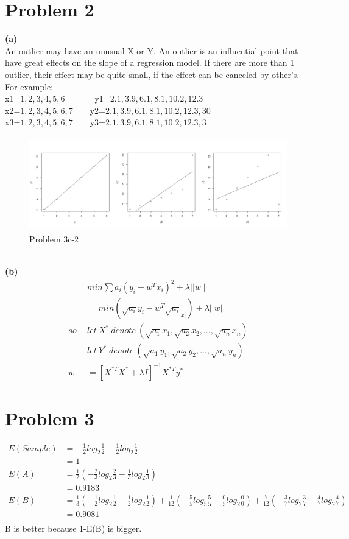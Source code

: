 \documentclass[11pt]{scrartcl}
\begin{document}
\section*{Problem 2}
\textbf{(a)}\\
An outlier may have an unusual X or Y. An outlier is an influential point that have great effects on the slope of a regression model. If there are more than 1 outlier, their effect may be quite small, if the effect can be canceled by other's. For example:\\
x1=\(1,2,3,4,5,6\)\ \ \ \ \ \ \ 
y1=\(2.1,3.9,6.1,8.1,10.2,12.3\)\\
x2=\(1,2,3,4,5,6,7\)\ \ \ \ 
y2=\(2.1,3.9,6.1,8.1,10.2,12.3,30\)\\
x3=\(1,2,3,4,5,6,7\)\ \ \ \ 
y3=\(2.1,3.9,6.1,8.1,10.2,12.3,3\)\\
\begin{figure} 
	\includegraphics[width=5.5in,height=1.6in]{Q2a.jpg}
	\caption{Problem 3c-2}
\end{figure}\\
\textbf{(b)}\\
\begin{equation*}
\begin{aligned}
&min\sum a_i(y_i-w^T x_i)^2+\lambda||w||\\
&=min(\sqrt{a_i}y_i-w^T \sqrt{a_i}_x_i)+\lambda||w||\\
so\ \ &let\ X^*\ denote\ (\sqrt{a_1} x_1,\sqrt{a_2} x_2,...,\sqrt{a_n} x_n)\\
&let\ Y^*\ denote\ (\sqrt{a_1} y_1,\sqrt{a_2} y_2,...,\sqrt{a_n} y_n)\\
w&=[X^{*T} X^* +\lambda I]^{-1} X^{*T}y^*
\end{aligned}
\end{equation*}
\section*{Problem 3}
\begin{equation*}
\begin{aligned}
E(Sample)&=-\frac{1}{2}log_{2}\frac{1}{2}-\frac{1}{2}log_{2}\frac{1}{2}\\
&=1\\
E(A)&=\frac{1}{2}(-\frac{2}{3}log_{2}\frac{2}{3}-\frac{1}{3}log_{2}\frac{1}{3})\\
&=0.9183\\
E(B)&=
\frac{1}{3}(-\frac{1}{2}log_{2}\frac{1}{2}-\frac{1}{2}log_{2}\frac{1}{2})
+\frac{1}{12}(-\frac{5}{5}log_{5}\frac{5}{5}-\frac{0}{5}log_{2}\frac{0}{0})
+\frac{7}{12}(-\frac{3}{7}log_{2}\frac{3}{7}-\frac{4}{7}log_{2}\frac{4}{7})\\
&=0.9081\\
\end{aligned}
\end{equation*}
B is better because 1-E(B) is bigger.\\
\end{document}
